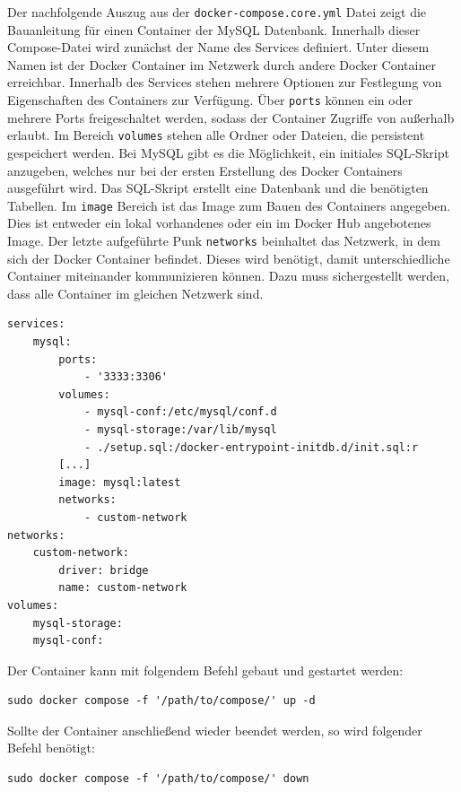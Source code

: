 Der nachfolgende Auszug aus der \texttt{docker-compose.core.yml} Datei zeigt die Bauanleitung für einen Container der MySQL Datenbank. Innerhalb dieser Compose-Datei wird zunächst der Name des Services definiert. Unter diesem Namen ist der Docker Container im Netzwerk durch andere Docker Container erreichbar. Innerhalb des Services stehen mehrere Optionen zur Festlegung von Eigenschaften des Containers zur Verfügung. Über \texttt{ports} können ein oder mehrere Ports freigeschaltet werden, sodass der Container Zugriffe von außerhalb erlaubt. Im Bereich \texttt{volumes} stehen alle Ordner oder Dateien, die persistent gespeichert werden. Bei MySQL gibt es die Möglichkeit, ein initiales SQL-Skript anzugeben, welches nur bei der ersten Erstellung des Docker Containers ausgeführt wird. Das SQL-Skript erstellt eine Datenbank und die benötigten Tabellen. Im \texttt{image} Bereich ist das Image zum Bauen des Containers angegeben. Dies ist entweder ein lokal vorhandenes oder ein im Docker Hub angebotenes Image. Der letzte aufgeführte Punk \texttt{networks} beinhaltet das Netzwerk, in dem sich der Docker Container befindet. Dieses wird benötigt, damit unterschiedliche Container miteinander kommunizieren können. Dazu muss sichergestellt werden, dass alle Container im gleichen Netzwerk sind.

\begin{lstlisting}[caption={Docker-Compose-Datei zum Aufsetzen und Starten der Container}]
services:
    mysql: 
        ports: 
            - '3333:3306'
        volumes: 
            - mysql-conf:/etc/mysql/conf.d
            - mysql-storage:/var/lib/mysql
            - ./setup.sql:/docker-entrypoint-initdb.d/init.sql:r
        [...]
        image: mysql:latest
        networks:
            - custom-network
networks: 
    custom-network:
        driver: bridge
        name: custom-network
volumes:
    mysql-storage:
    mysql-conf:
\end{lstlisting}

Der Container kann mit folgendem Befehl gebaut und gestartet werden:
\begin{lstlisting}[caption={Starten eines Docker-Containers}]
sudo docker compose -f '/path/to/compose/' up -d
\end{lstlisting}

Sollte der Container anschließend wieder beendet werden, so wird folgender Befehl benötigt: 
\begin{lstlisting}[caption={Beenden eines Docker-Containers}]
sudo docker compose -f '/path/to/compose/' down
\end{lstlisting}
